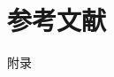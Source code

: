 \section{参考文献}
\printbibliography[heading=none]

\appendix
\begin{center}
\heiti{} 附\hspace{1pc}录
\end{center}
